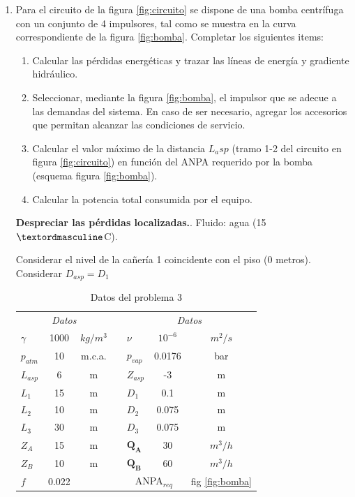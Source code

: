 \documentclass[a4paper,10pt]{article}
\begin{document}
\begin{enumerate}
\clearpage
 \item Para el circuito de la figura \ref{fig:circuito} se dispone de una bomba centrífuga con un conjunto de 4 impulsores, tal como se  muestra en la curva correspondiente de la figura \ref{fig:bomba}. Completar los siguientes items:
 \begin{enumerate}
  \item Calcular las pérdidas energéticas y trazar las líneas de energía y  gradiente hidráulico.
  \item Seleccionar, mediante la figura \ref{fig:bomba},
  el impulsor que se adecue a las demandas del sistema. En caso de ser necesario, agregar los
  accesorios que permitan alcanzar las condiciones de servicio.
  \item Calcular el valor máximo de la distancia $L_asp$ (tramo 1-2 del circuito en figura \ref{fig:circuito})  en función del ANPA requerido por la bomba (esquema figura \ref{fig:bomba}).
  \item Calcular la potencia total consumida por el equipo.
 \end{enumerate}

 \textbf{Despreciar las pérdidas localizadas.}. Fluido: agua (15 $\textordmasculine$C).
   
 Considerar el nivel de la cañería 1 coincidente con el piso (0 metros). Considerar $D_{asp} = D_1$

\begin{table}[!h]
  \centering
  \begin{tabular}{|l|c|c|p{2cm}|l|c|c|}
    \cline{1-3} \cline{5-7}
    \multicolumn{3}{|c|}{\textit{Datos}} && \multicolumn{3}{|c|}{\textit{Datos}} \\
    \cline{1-3} \cline{5-7}
    $\gamma$ & 1000 & $kg/m^3$ && $\nu$ & $10^{-6}$& $m^2/s$ \\
    \cline{1-3} \cline{5-7} 
    $p_{atm}$ & 10 & m.c.a. &&  $p_{vap}$ & 0.0176& bar \\ 
    \cline{1-3} \cline{5-7}
    $L_{asp}$ & 6 & m && $Z_{asp}$ & -3 & m \\
    \cline{1-3} \cline{5-7} 
    $L_1$ & 15 & m && $D_1$ & 0.1 & m \\ 
    \cline{1-3} \cline{5-7} 
    $L_2$ & 10 & m && $D_2$ & 0.075 & m \\ 
    \cline{1-3} \cline{5-7} 
    $L_3$ & 30 & m && $D_3$ & 0.075 & m \\ 
    \cline{1-3} \cline{5-7}
    $Z_A$ & 15 & m && $\mathbf{Q_A}$ & 30 & $m^3/h$ \\ 
    \cline{1-3} \cline{5-7}
    $Z_B$ & 10 & m && $\mathbf{Q_B}$ & 60 & $m^3/h$ \\ 
    \cline{1-3} \cline{5-7}
    $f$ & 0.022 &  && \multicolumn{2}{c|}{ANPA$_{req}$} & fig \ref{fig:bomba}\\ 
    \cline{1-3} \cline{5-7} 
  \end{tabular}  
  \caption{Datos del problema 3}
  \label{tab:circuito}
  \end{table}


\end{enumerate}
\end{document}
